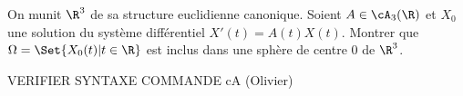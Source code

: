 \begin{enonce}
\begin{exercise}[ID={RMS134 E981},subtitle={Mines-Ponts PSI
    2023},tags={oraux}, concours=mines-ponts, annee=2023, filiere=PSI,
  theme=analyse, difficulty={0}]

  On munit $\R^3$ de sa structure euclidienne canonique.
  Soient $A\in\cA_3(\R)$ et $X_0$ une solution du système différentiel $X'(t) = A(t) X(t)$.
  Montrer que $\Omega = \Set{X_0(t) | t\in\R}$ est inclus dans une
  sphère de centre $0$ de $\R^3$.

  VERIFIER SYNTAXE COMMANDE cA (Olivier)
\end{exercise}
\begin{solution}
\end{solution}
\end{enonce}
